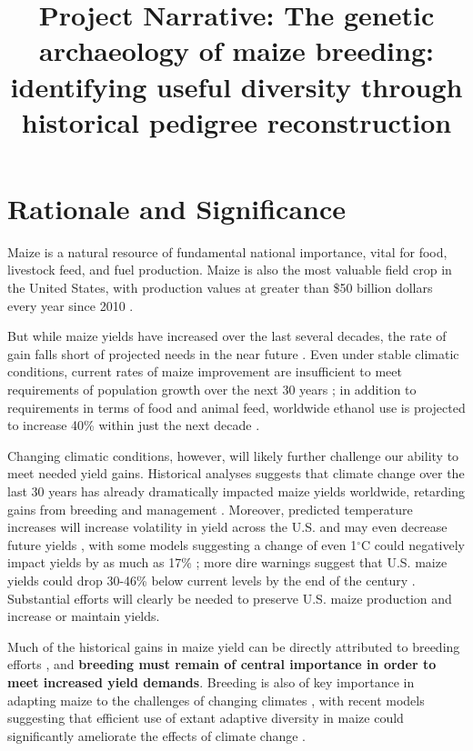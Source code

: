\documentclass[draft,12pt]{article}
\begin{document}
\title{Project Narrative: The genetic archaeology of maize breeding: identifying useful diversity through historical pedigree reconstruction}
\author{}
\date{}
\maketitle

\section*{Rationale and Significance}
\label{sec:rationale}

Maize is a natural resource of fundamental national importance, vital for food, livestock feed, and fuel production.
Maize is also the most valuable field crop in the United States, with production values at greater than \$50 billion dollars every year since 2010 \citep{usdanass}. 

But while maize yields have increased over the last several decades, the rate of gain falls short of projected needs in the near future \citep{grassini2013distinguishing}.
Even under stable climatic conditions, current rates of maize improvement are insufficient to meet requirements of population growth over the next 30 years \citep{ray2013yield}; in  addition to requirements in terms of food and animal feed, worldwide ethanol use is projected to increase 40\% within just the next decade \citep{usdalong}.

Changing climatic conditions, however, will likely further challenge our ability to meet needed yield gains. 
Historical analyses suggests that climate change over the last 30 years has already dramatically impacted maize yields worldwide, retarding gains from breeding and management \citep{Lobell2011}.
Moreover, predicted temperature increases will increase volatility in yield across the U.S. and may even decrease future yields \citep{urban2012projected}, with some models suggesting a change of even 1$^{\circ}$C could negatively impact yields by as much as 17\% \citep{lobell2003climate}; more dire warnings suggest that U.S. maize yields could drop 30-46\% below current levels by the end of the century \citep{schlenker2009nonlinear}.
Substantial efforts will clearly be needed to preserve U.S. maize production and increase or maintain yields.  

Much of the historical gains in maize yield can be directly attributed to breeding efforts \citep{Duvick1992, duvick2005genetic}, and \textbf{ breeding must remain of central importance in order to meet increased yield demands}.  
Breeding is also of key importance in adapting maize to the challenges of changing climates \citep{Troyer2004a}, with recent models suggesting that efficient use of extant adaptive diversity in maize could significantly ameliorate the effects of climate change \citep{butler2013adaptation}.   
\end{document}

